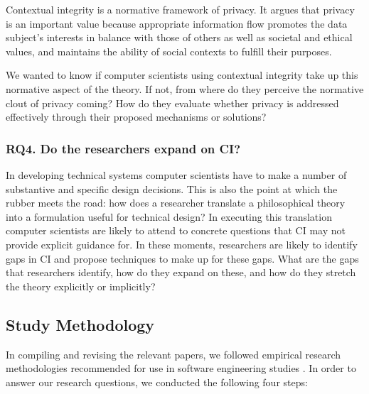 \documentclass[../thesis.tex]{subfiles}
\begin{document}
Contextual integrity is a normative
framework of privacy.
It argues that privacy is an important value
because appropriate information flow promotes the data
subject's interests in balance with those of others as well
as societal and ethical values, and maintains
the ability of social contexts to fulfill their purposes.

We wanted to know if computer scientists
using contextual integrity take up this normative aspect of the theory.
If not, from where do they perceive the normative clout of privacy
coming? How do they evaluate whether privacy is addressed effectively
through their proposed mechanisms or solutions?

\subsubsection{RQ4. Do the researchers expand on CI?}

In developing technical systems computer scientists have to make a
number of substantive and specific design decisions. This is also the
point at which the rubber meets the road: how does a researcher
translate a philosophical theory into a formulation useful for
technical design? In executing this translation computer scientists are
likely to attend to concrete questions that CI may not provide explicit
guidance for. In these moments, researchers are likely to identify gaps
in CI and propose techniques to make up for these gaps. What are the
gaps that researchers identify, how do they expand on these, and how do
they stretch the theory explicitly or implicitly?

\subsection{Study Methodology}
\label{CI3.2}

In compiling and revising the relevant papers, we followed empirical
research methodologies recommended for use in software engineering
studies \citep{kitchenham2007guidelines}.
In order to answer our research
questions, we conducted the following four steps: 
\end{document}
